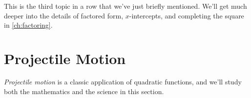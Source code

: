 This is the third topic in a row that we've just briefly mentioned. We'll get much deeper into the details of factored form, $x$-intercepts, and completing the square in \cref{ch:factoring}.












%



%
%
%
%
%
%
%
%
%

\section{Projectile Motion}
\label{sec:projectilemotion}

\textit{Projectile motion} is a classic application of quadratic functions, and we'll study both the mathematics and the science in this section.

